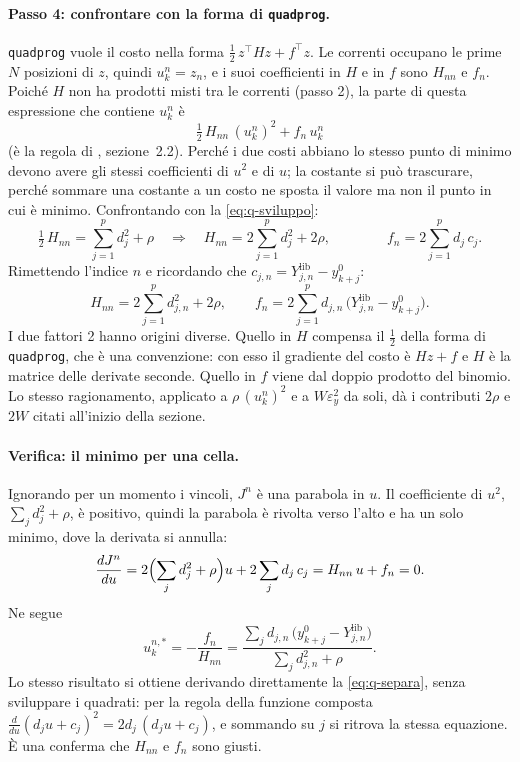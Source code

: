 \documentclass[11pt,a4paper]{article}
\newcommand{\file}[1]{\texttt{\detokenize{#1}}}
\newcommand{\lib}{\mathrm{lib}}
\begin{document}
\paragraph{Passo 4: confrontare con la forma di \texttt{quadprog}.}
\texttt{quadprog} vuole il costo nella forma $\tfrac12\, z^\top H z + f^\top
z$. Le correnti occupano le prime $N$ posizioni di $z$, quindi $u^n_k = z_n$,
e i suoi coefficienti in $H$ e in $f$ sono $H_{nn}$ e $f_n$. Poiché $H$ non ha
prodotti misti tra le correnti (passo 2), la parte di questa espressione che
contiene $u^n_k$ è
\[
  \tfrac12\, H_{nn}\,(u^n_k)^2 + f_n\, u^n_k
\]
(è la regola di \file{Problema_QP_MPC.pdf}, sezione~2.2). Perché i due costi
abbiano lo stesso punto di minimo devono avere gli stessi coefficienti di
$u^2$ e di $u$; la costante si può trascurare, perché sommare una costante a
un costo ne sposta il valore ma non il punto in cui è minimo. Confrontando con
la \eqref{eq:q-sviluppo}:
\[
  \tfrac12\, H_{nn} = \sum_{j=1}^{p} d_j^2 + \rho
  \quad\Longrightarrow\quad
  H_{nn} = 2\sum_{j=1}^{p} d_j^2 + 2\rho ,
  \qquad\qquad
  f_n = 2\sum_{j=1}^{p} d_j\,c_j .
\]
Rimettendo l'indice $n$ e ricordando che $c_{j,n} = Y^\lib_{j,n} - y^0_{k+j}$:
\begin{equation}
  H_{nn} = 2\sum_{j=1}^{p} d_{j,n}^2 + 2\rho, \qquad
  f_n = 2\sum_{j=1}^{p} d_{j,n}\,\bigl(Y^\lib_{j,n} - y^0_{k+j}\bigr) .
  \label{eq:jt-hf}
\end{equation}
I due fattori 2 hanno origini diverse. Quello in $H$ compensa il
$\tfrac12$ della forma di \texttt{quadprog}, che è una convenzione: con esso il
gradiente del costo è $Hz + f$ e $H$ è la matrice delle derivate seconde.
Quello in $f$ viene dal doppio prodotto del binomio. Lo stesso ragionamento,
applicato a $\rho\,(u^n_k)^2$ e a $W \varepsilon_y^2$ da soli, dà i contributi $2\rho$ e
$2W$ citati all'inizio della sezione.

\paragraph{Verifica: il minimo per una cella.} Ignorando per un momento i
vincoli, $J^n$ è una parabola in $u$. Il coefficiente di $u^2$,
$\sum_j d_j^2 + \rho$, è positivo, quindi la parabola è rivolta verso l'alto e
ha un solo minimo, dove la derivata si annulla:
\[
  \frac{dJ^n}{du} = 2\Bigl(\sum_j d_j^2 + \rho\Bigr) u + 2\sum_j d_j\,c_j
                  = H_{nn}\, u + f_n = 0 .
\]
Ne segue
\begin{equation}
  u^{n,*}_k = -\frac{f_n}{H_{nn}}
        = \frac{\sum_{j} d_{j,n}\,\bigl(y^0_{k+j} - Y^\lib_{j,n}\bigr)}
               {\sum_{j} d_{j,n}^2 + \rho} .
  \tag{Q4}\label{eq:q-minimo}
\end{equation}
Lo stesso risultato si ottiene derivando direttamente la
\eqref{eq:q-separa}, senza sviluppare i quadrati: per la regola della
funzione composta $\frac{d}{du}(d_j u + c_j)^2 = 2 d_j\,(d_j u + c_j)$, e
sommando su $j$ si ritrova la stessa equazione. È una conferma che
$H_{nn}$ e $f_n$ sono giusti.
\end{document}

